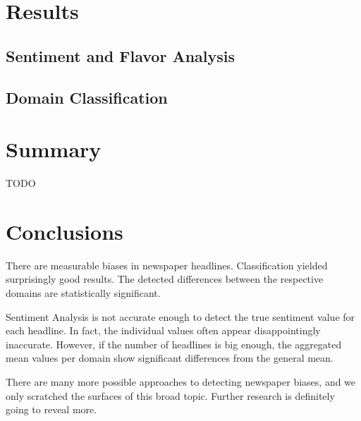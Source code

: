 \documentclass[final]{ieee}
\begin{document}
\section{Results}

\subsection{Sentiment and Flavor Analysis}

\subsection{Domain Classification}
            
\section{Summary}
TODO

\section{Conclusions}
There are measurable biases in newspaper headlines. Classification yielded surprisingly good results. The detected differences between the respective domains are statistically significant.

Sentiment Analysis is not accurate enough to detect the true sentiment value for each headline. In fact, the individual values often appear disappointingly inaccurate. However, if the number of headlines is big enough, the aggregated mean values per domain show significant differences from the general mean.

There are many more possible approaches to detecting newspaper biases, and we only scratched the surfaces of this broad topic. Further research is definitely going to reveal more. %
\end{document}

